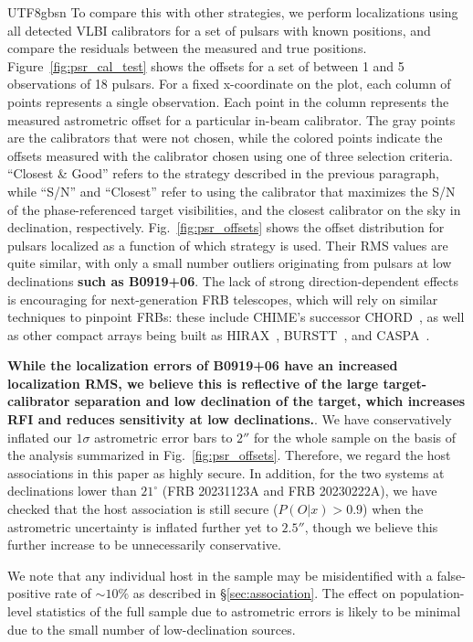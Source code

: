 \documentclass[twocolumn,linenumbers]{aastex631}
\newcommand{\msbold}[1]{\textbf{#1}}
\begin{document}
\begin{CJK*}{UTF8}{gbsn}
To compare this with other strategies, we perform localizations using all detected VLBI calibrators for a set of pulsars with known positions, and compare the residuals between the measured and true positions. Figure~\ref{fig:psr_cal_test} shows the offsets for a set of between 1 and 5 observations of 18 pulsars. For a fixed x-coordinate on the plot, each column of points represents a single observation. Each point in the column represents the measured astrometric offset for a particular in-beam calibrator. The gray points are the calibrators that were not chosen, while the colored points indicate the offsets measured with the calibrator chosen using one of three selection criteria. ``Closest \& Good'' refers to the strategy described in the previous paragraph, while ``S/N'' and ``Closest'' refer to using the calibrator that maximizes the S/N of the phase-referenced target visibilities, and the closest calibrator on the sky in declination, respectively.
Fig.~\ref{fig:psr_offsets} shows the offset distribution for pulsars localized as a function of which strategy is used. Their RMS values are quite similar, with only a small number outliers originating from pulsars at low declinations \msbold{such as B0919+06}. The lack of strong direction-dependent effects is encouraging for next-generation FRB telescopes, which will rely on similar techniques to pinpoint FRBs: these include CHIME's successor CHORD~\citep{vanderlinde2019canadian}, as well as other compact arrays being built as HIRAX~\citep{newburgh2016hirax}, BURSTT~\citep{lin2022burstt}, and CASPA~\citep{luo2024fast}. 

\msbold{While the localization errors of B0919+06 have an increased localization RMS, we believe this is reflective of the large target-calibrator separation and low declination of the target, which increases RFI and reduces sensitivity at low declinations.}. We have conservatively inflated our $1\sigma$ astrometric error bars to $2''$ for the whole sample on the basis of the analysis summarized in Fig.~\ref{fig:psr_offsets}. Therefore, we regard the host associations in this paper as highly secure. In addition, for the two systems at declinations lower than $21^\circ$ (FRB 20231123A and FRB 20230222A), we have checked that the host association is still secure ($P(O|x) > 0.9$) when the astrometric uncertainty is inflated further yet to $2.5''$, though we believe this further increase to be unnecessarily conservative.

We note that any individual host in the sample may be misidentified with a false-positive rate of $\sim 10\%$ as described in \S\ref{sec:association}. The effect on population-level statistics of the full sample due to astrometric errors is likely to be minimal due to the small number of low-declination sources.


\end{CJK*}
\end{document}
